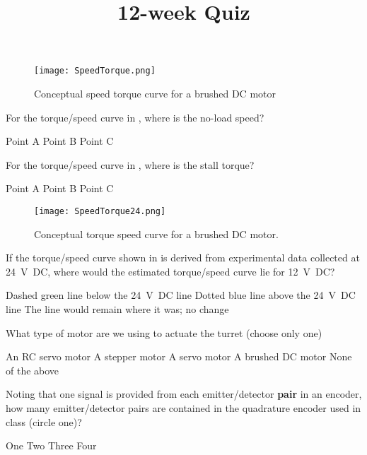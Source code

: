 \documentclass[addpoints,noanswers]{exam}
\title{12-week Quiz}
\author{\usnaInstructorShort}
\date{\printdate{4/1/2020}}
\begin{document}
\maketitle


\begin{figure}[h]
\begin{center}
\texttt{[image: SpeedTorque.png]}
\end{center}
\caption{Conceptual speed torque curve for a brushed DC motor}
\label{fig:1}
\end{figure}


\begin{questions}
\question[1]
For the torque/speed curve in , where is the no-load speed?
\begin{choices}
\choice Point A
\choice Point B
\CorrectChoice Point C
\end{choices}

\question[1]
For the torque/speed curve in , where is the stall torque?
\begin{choices}
\CorrectChoice Point A
\choice Point B
\choice Point C
\end{choices}

\clearpage
\begin{figure}[ht]
\begin{center}
\texttt{[image: SpeedTorque24.png]}
\end{center}
\caption{Conceptual torque speed curve for a brushed DC motor.}
\label{fig:2}
\end{figure}

\question[1]
If the torque/speed curve shown in  is derived from experimental data collected at \SI{24}{\volt DC}, where would the estimated torque/speed curve lie for \SI{12}{\volt DC}?
\begin{choices}
\CorrectChoice Dashed green line below the \SI{24}{\volt DC} line
\choice Dotted blue line above the \SI{24}{\volt DC} line
\choice The line would remain where it was; no change
\end{choices}

\question[1]
What type of motor are we using to actuate the turret (choose only one)
\begin{choices}
\choice An RC servo motor
\choice A stepper motor
\choice A servo motor
\CorrectChoice A brushed DC motor
\choice None of the above
\end{choices}

\question[1]
Noting that one signal is provided from each emitter/detector \textbf{pair} in an encoder, how many emitter/detector pairs are contained in the quadrature encoder used in class (circle one)?
\begin{choices}
\choice One
\CorrectChoice Two
\choice Three
\choice Four
\end{choices}


\end{questions}
\end{document}

